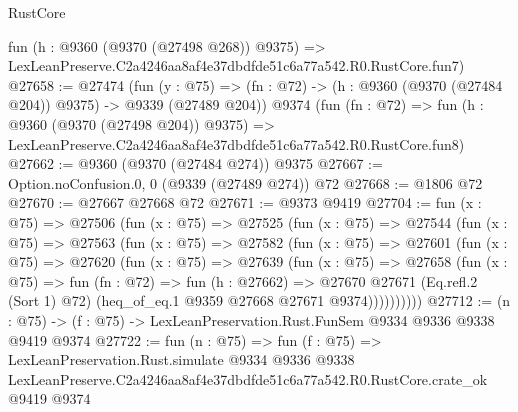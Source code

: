 \begin{lexlean}{RustCore}
\begin{coremodule}
    fun (h : @9360 (@9370 (@27498 @268)) @9375) =>
    LexLeanPreserve.C2a4246aa8af4e37dbdfde51c6a77a542.R0.RustCore.fun7)
@27658 := @27474
    (fun (y : @75) => (fn : @72) -> (h : @9360 (@9370 (@27484 @204)) @9375) -> @9339 (@27489 @204))
    @9374
    (fun (fn : @72) =>
    fun (h : @9360 (@9370 (@27498 @204)) @9375) =>
    LexLeanPreserve.C2a4246aa8af4e37dbdfde51c6a77a542.R0.RustCore.fun8)
@27662 := @9360 (@9370 (@27484 @274)) @9375
@27667 := Option.noConfusion.{0, 0} (@9339 (@27489 @274)) @72
@27668 := @1806 @72
@27670 := @27667 @27668 @72
@27671 := @9373 @9419
@27704 := fun (x : @75) =>
  @27506
    (fun (x : @75) =>
    @27525
      (fun (x : @75) =>
      @27544
        (fun (x : @75) =>
        @27563
          (fun (x : @75) =>
          @27582
            (fun (x : @75) =>
            @27601
              (fun (x : @75) =>
              @27620
                (fun (x : @75) =>
                @27639
                  (fun (x : @75) =>
                  @27658
                    (fun (x : @75) =>
                    fun (fn : @72) =>
                    fun (h : @27662) =>
                    @27670
                      @27671
                      (Eq.refl.{2} (Sort 1) @72)
                      (heq_of_eq.{1} @9359 @27668 @27671 @9374))))))))))
@27712 := (n : @75) -> (f : @75) -> LexLeanPreservation.Rust.FunSem @9334 @9336 @9338 @9419 @9374
@27722 := fun (n : @75) =>
  fun (f : @75) =>
  LexLeanPreservation.Rust.simulate
    @9334
    @9336
    @9338
    LexLeanPreserve.C2a4246aa8af4e37dbdfde51c6a77a542.R0.RustCore.crate_ok
    @9419
    @9374
\end{coremodule}
\end{lexlean}
